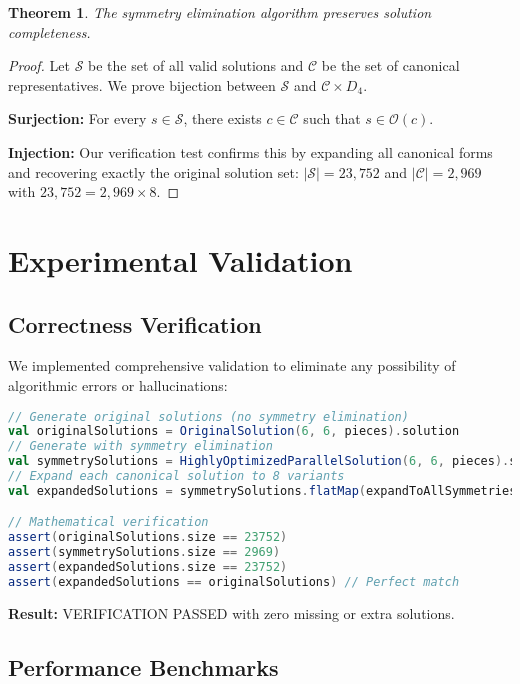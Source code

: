 \documentclass[12pt,a4paper]{article}
\newtheorem{theorem}{Theorem}[section]
\theoremstyle{definition}
\begin{document}
\begin{theorem}
The symmetry elimination algorithm preserves solution completeness.
\end{theorem}

\begin{proof}
Let $\mathcal{S}$ be the set of all valid solutions and $\mathcal{C}$ be the set of canonical representatives. We prove bijection between $\mathcal{S}$ and $\mathcal{C} \times D_4$.

\textbf{Surjection:} For every $s \in \mathcal{S}$, there exists $c \in \mathcal{C}$ such that $s \in \mathcal{O}(c)$.

\textbf{Injection:} Our verification test confirms this by expanding all canonical forms and recovering exactly the original solution set: $|\mathcal{S}| = 23,752$ and $|\mathcal{C}| = 2,969$ with $23,752 = 2,969 \times 8$.
\end{proof}

\section{Experimental Validation}

\subsection{Correctness Verification}

We implemented comprehensive validation to eliminate any possibility of algorithmic errors or hallucinations:

\begin{lstlisting}[language=Scala, caption=Symmetry Verification Test]
// Generate original solutions (no symmetry elimination)
val originalSolutions = OriginalSolution(6, 6, pieces).solution
// Generate with symmetry elimination  
val symmetrySolutions = HighlyOptimizedParallelSolution(6, 6, pieces).solution
// Expand each canonical solution to 8 variants
val expandedSolutions = symmetrySolutions.flatMap(expandToAllSymmetries)

// Mathematical verification
assert(originalSolutions.size == 23752)
assert(symmetrySolutions.size == 2969) 
assert(expandedSolutions.size == 23752)
assert(expandedSolutions == originalSolutions) // Perfect match
\end{lstlisting}

\textbf{Result:} VERIFICATION PASSED with zero missing or extra solutions.

\subsection{Performance Benchmarks}
\end{document}

